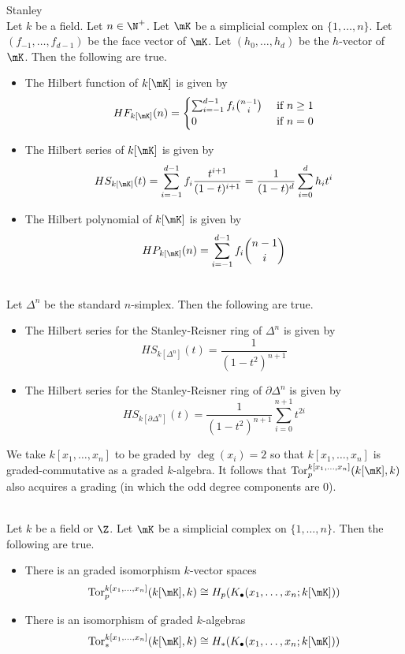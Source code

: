 \documentclass[a4paper]{article}
\begin{document}
\begin{thm}{Stanley}{}\\
Let $k$ be a field. Let $n\in\N^+$. Let $\mK$ be a simplicial complex on $\{1,\dots,n\}$. Let $(f_{-1},\dots,f_{d-1})$ be the face vector of $\mK$. Let $(h_0,\dots,h_d)$ be the $h$-vector of $\mK$. Then the following are true. 
\begin{itemize}
\item The Hilbert function of $k[\mK]$ is given by $$HF_{k[\mK]}(n)=\begin{cases}
\sum_{i=-1}^{d-1}f_i\binom{n-1}{i} & \text{ if }n\geq 1\\
0 & \text{ if }n=0
\end{cases}$$
\item The Hilbert series of $k[\mK]$ is given by $$HS_{k[\mK]}(t)=\sum_{i=-1}^{d-1}f_i\frac{t^{i+1}}{(1-t)^{i+1}}=\frac{1}{(1-t)^d}\sum_{i=0}^dh_it^i$$
\item The Hilbert polynomial of $k[\mK]$ is given by $$HP_{k[\mK]}(n)=\sum_{i=-1}^{d-1}f_i\binom{n-1}{i}$$
\end{itemize}
\end{thm}

\begin{eg}{}{}\\
Let $\Delta^n$ be the standard $n$-simplex. Then the following are true. 
\begin{itemize}
\item The Hilbert series for the Stanley-Reisner ring of $\Delta^n$ is given by $$HS_{k[\Delta^n]}(t)=\frac{1}{(1-t^2)^{n+1}}$$
\item The Hilbert series for the Stanley-Reisner ring of $\partial\Delta^n$ is given by $$HS_{k[\partial\Delta^n]}(t)=\frac{1}{(1-t^2)^{n+1}}\sum_{i=0}^{n+1}t^{2i}$$
\end{itemize}
\end{eg}

We take $k[x_1,\dots,x_n]$ to be graded by $\deg(x_i)=2$ so that $k[x_1,\dots,x_n]$ is graded-commutative as a graded $k$-algebra. It follows that $\text{Tor}_p^{k[x_1,\dots,x_n]}(k[\mK],k)$ also acquires a grading (in which the odd degree components are $0$). 

\begin{prp}{}{}\\
Let $k$ be a field or $\Z$. Let $\mK$ be a simplicial complex on $\{1,\dots,n\}$. Then the following are true. 
\begin{itemize}
\item There is an graded isomorphism $k$-vector spaces $$\text{Tor}_p^{k[x_1,\dots,x_n]}(k[\mK],k)\cong H_p(K_\bullet(x_1,\dots,x_n;k[\mK]))$$
\item There is an isomorphism of graded $k$-algebras $$\text{Tor}_\ast^{k[x_1,\dots,x_n]}(k[\mK],k)\cong H_\ast(K_\bullet(x_1,\dots,x_n;k[\mK]))$$
\end{itemize}
\end{prp}
\end{document}
